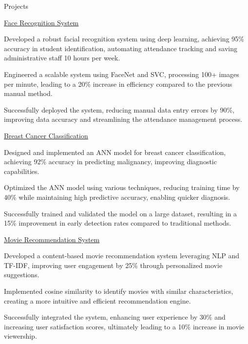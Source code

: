 \documentclass{resume} %
\begin{document}
    \begin{rSection}{Projects}
                    \begin{rSubsection}
                                    {\href{Github Link}{Face Recognition System}}
                                {}{}{}
                                    \item Developed a robust facial recognition system using deep learning, achieving 95\% accuracy in student identification, automating attendance tracking and saving administrative staff 10 hours per week.
                                    \item Engineered a scalable system using FaceNet and SVC, processing 100+ images per minute, leading to a 20\% increase in efficiency compared to the previous manual method.
                                    \item Successfully deployed the system, reducing manual data entry errors by 90\%, improving data accuracy and streamlining the attendance management process.
                            \end{rSubsection}
                    \begin{rSubsection}
                                    {\href{Github Link}{Breast Cancer Classification}}
                                {}{}{}
                                    \item Designed and implemented an ANN model for breast cancer classification, achieving 92\% accuracy in predicting malignancy, improving diagnostic capabilities.
                                    \item Optimized the ANN model using various techniques, reducing training time by 40\% while maintaining high predictive accuracy, enabling quicker diagnosis.
                                    \item Successfully trained and validated the model on a large dataset, resulting in a 15\% improvement in early detection rates compared to traditional methods.
                            \end{rSubsection}
                    \begin{rSubsection}
                                    {\href{Github Link}{Movie Recommendation System}}
                                {}{}{}
                                    \item Developed a content-based movie recommendation system leveraging NLP and TF-IDF, improving user engagement by 25\% through personalized movie suggestions.
                                    \item Implemented cosine similarity to identify movies with similar characteristics, creating a more intuitive and efficient recommendation engine.
                                    \item Successfully integrated the system, enhancing user experience by 30\% and increasing user satisfaction scores, ultimately leading to a 10\% increase in movie viewership.
                            \end{rSubsection}
            \end{rSection}
\end{document}
